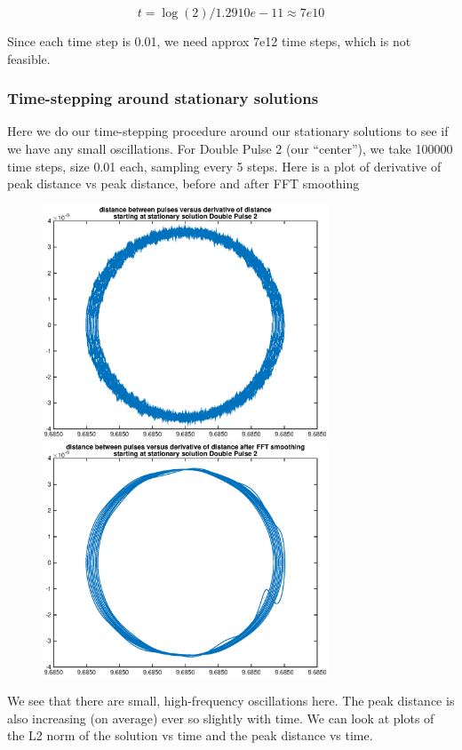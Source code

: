 \documentclass[12pt]{article}
\begin{document}
\[ t = \log(2) / 1.2910e-11 \approx 7e10 \] 

Since each time step is 0.01, we need approx 7e12 time steps, which is not feasible.

\subsubsection*{Time-stepping around stationary solutions}

Here we do our time-stepping procedure around our stationary solutions to see if we have any small oscillations. For Double Pulse 2 (our ``center''), we take 100000 time steps, size 0.01 each, sampling every 5 steps. Here is a plot of derivative of peak distance vs peak distance, before and after FFT smoothing

\begin{figure}[H]
	\includegraphics[width=8.5cm]{stationary1a.eps}
	\includegraphics[width=8.5cm]{smoothstationary1a.eps}
\end{figure}
We see that there are small, high-frequency oscillations here. The peak distance is also increasing (on average) ever so slightly with time. We can look at plots of the L2 norm of the solution vs time and the peak distance vs time.
\end{document}

